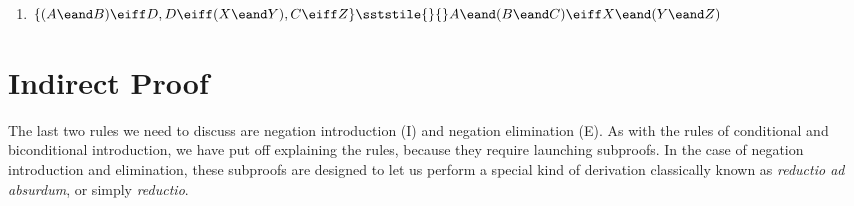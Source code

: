 \begin{enumerate}[label=(\arabic*)]
\item $\{(A \eand B) \eiff D, D \eiff (X \eand Y), C \eiff Z\} \sststile{}{} A \eand (B \eand C) \eiff X \eand (Y \eand Z)$
%
%
%	



\end{enumerate}	




\section{Indirect Proof}



The last two rules we need to discuss are negation introduction (\enot I)  and negation elimination (\enot E). As with the rules of conditional and biconditional introduction, we have put off explaining the rules, because they require launching subproofs. In the case of negation introduction and elimination, these subproofs are designed to let us perform a special kind of derivation classically known as \emph{reductio ad absurdum}, or simply \emph{reductio}. 

